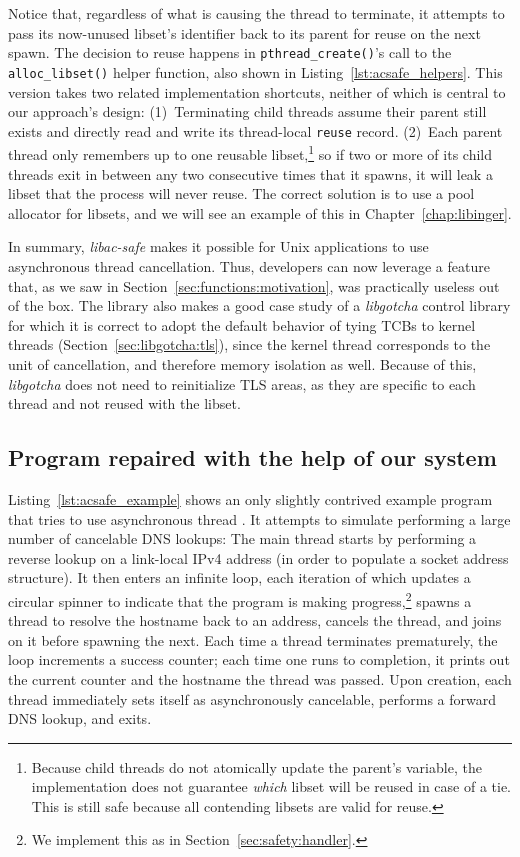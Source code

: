 Notice that, regardless of what is causing the thread to terminate, it attempts to
pass
its now-unused libset's identifier back to its parent for reuse on the next spawn.
The decision to reuse happens in \texttt{pthread\_create()}'s call to the
\texttt{alloc\_libset()} helper function, also shown in
Listing~\ref{lst:acsafe_helpers}.  This version takes two related
implementation shortcuts, neither of which is central to our approach's design:
(1)~Terminating child threads assume their parent still exists and directly read and
write its thread-local \texttt{reuse} record.  (2)~Each parent thread only remembers
up to one reusable libset,\footnote{Because child threads do not atomically update
the parent's variable, the implementation does not guarantee \textit{which} libset
will be reused in case of a tie.  This is still safe because all contending libsets
are valid for reuse.} so if two or more of its child threads exit in between
any two consecutive times that it spawns, it will leak a libset that the process will
never reuse.  The correct solution is to use a pool allocator for libsets, and we
will see an example of this in Chapter~\ref{chap:libinger}.

In summary, \textit{libac-safe} makes it possible for Unix applications to use
asynchronous thread cancellation.  Thus, developers can now leverage a feature that,
as we saw in Section~\ref{sec:functions:motivation}, was practically useless out of
the box.
The library also makes a good case study of a \textit{libgotcha} control library for
which it is correct to adopt the default behavior of tying TCBs to kernel threads
(Section~\ref{sec:libgotcha:tls}), since the kernel thread corresponds to the unit of
cancellation, and therefore memory isolation as well.  Because of this,
\textit{libgotcha} does not need to reinitialize TLS areas, as they are specific to
each thread and not reused with the libset.


\subsection{Program repaired with the help of our system}
\label{sec:safety:thread}

Listing~\ref{lst:acsafe_example} shows an only slightly contrived example program
that tries to use asynchronous thread .  It attempts to simulate
performing a large number of cancelable DNS lookups:  The main thread starts by
performing a reverse lookup on a link-local IPv4 address (in order to populate a
socket address structure).  It then enters an infinite loop, each iteration of which
updates a circular spinner to indicate that the program is making
progress,\footnote{We implement this as in Section~\ref{sec:safety:handler}.} spawns
a thread to resolve the hostname back to an address, cancels the thread, and joins on
it before spawning the next.  Each time a thread terminates prematurely, the loop
increments a success counter; each time one runs to completion, it prints out the
current counter and the hostname the thread was passed.  Upon creation, each thread
immediately sets itself as asynchronously cancelable, performs a forward DNS lookup,
and exits.

